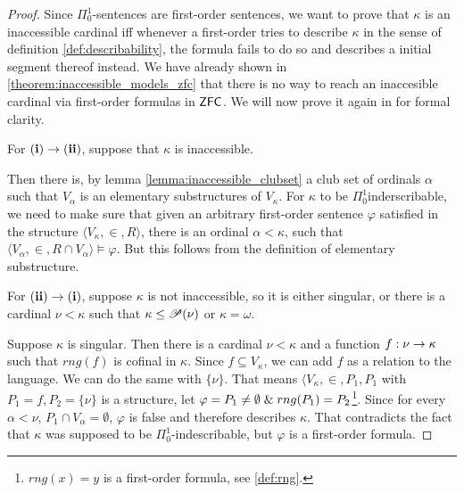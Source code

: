 

\begin{proof}
Since $\Pi^1_0$-sentences are first-order sentences, we want to prove that $\kappa$ is an inaccessible cardinal iff whenever a first-order tries to describe $\kappa$ in the sense of definition \ref{def:describability}, the formula fails to do so and describes a initial segment thereof instead.
We have already shown in \ref{theorem:inaccessible_models_zfc} that there is no way to reach an inaccesible cardinal via first-order formulas in $\sf{ZFC}$. We will now prove it again in for formal clarity.

For $\bold{(i) \rightarrow (ii)}$, suppose that $\kappa$ is inaccessible.

Then there is, by lemma \ref{lemma:inaccessible_clubset} a club set of ordinals $\alpha$ such that $V_\alpha$ is an elementary substructures of $V_\kappa$. For $\kappa$ to be $\Pi^1_0$inderscribable, we need to make sure that given an arbitrary first-order sentence $\varphi$ satisfied in the structure $\langle V_\kappa, \in, R \rangle$, there is an ordinal $\alpha < \kappa$, such that $\langle V_\alpha, \in, R \cap V_\alpha \rangle \models \varphi$. But this follows from the definition of elementary substructure.

For $\bold{(ii) \rightarrow (i)}$, suppose $\kappa$ is not inaccessible, so it is either singular, or there is a cardinal $\nu < \kappa$ such that $\kappa \leq \mathscr{P} (\nu)$ or $\kappa=\omega$. 


Suppose $\kappa$ is singular. Then there is a cardinal $\nu < \kappa$ and a function $f: \nu \rightarrow \kappa$ such that $rng(f)$ is cofinal in $\kappa$. Since $f \subseteq V_\kappa$, we can add $f$ as a relation to the language. We can do the same with $\{\nu\}$. That means $\langle V_\kappa, \in, P_1, P_1$ with $P_1 = f, P_2 = \{\nu\}$ is a structure, 
let $\varphi = P_1 \neq \emptyset \mathrel{\&} rng(P_1) = P_2$\footnote{$rng(x)=y$ is a first-order formula, see \ref{def:rng}.}. Since for every $\alpha < \nu$, $P_1 \cap V_\alpha = \emptyset$, $\varphi$ is false and therefore describes $\kappa$. That contradicts the fact that $\kappa$ was supposed to be $\Pi^1_0$-indescribable, but $\varphi$ is a first-order formula.


\end{proof}
